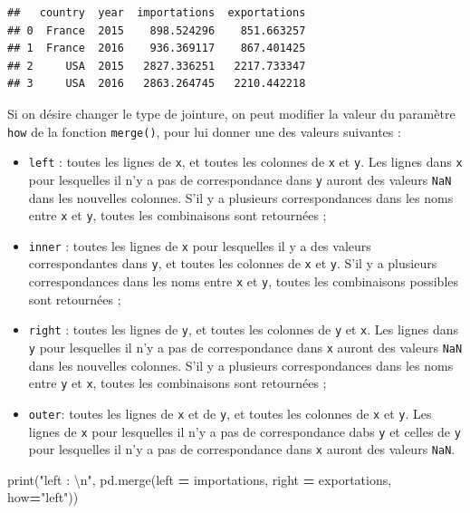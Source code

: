 \documentclass[
  12pt,
]{book}
\newenvironment{Shaded}{\begin{snugshade}}{\end{snugshade}}
\newcommand{\BuiltInTok}[1]{#1}
\newcommand{\CharTok}[1]{\textcolor[rgb]{0.31,0.60,0.02}{#1}}
\newcommand{\NormalTok}[1]{#1}
\newcommand{\OperatorTok}[1]{\textcolor[rgb]{0.81,0.36,0.00}{\textbf{#1}}}
\newcommand{\StringTok}[1]{\textcolor[rgb]{0.31,0.60,0.02}{#1}}
\providecommand{\tightlist}{%
  \setlength{\itemsep}{0pt}\setlength{\parskip}{0pt}}
\numberwithin{equation}{section}
\numberwithin{countremarque}{section}
\begin{document}
\begin{lstlisting}
##   country  year  importations  exportations
## 0  France  2015    898.524296    851.663257
## 1  France  2016    936.369117    867.401425
## 2     USA  2015   2827.336251   2217.733347
## 3     USA  2016   2863.264745   2210.442218
\end{lstlisting}

Si on désire changer le type de jointure, on peut modifier la valeur du paramètre \texttt{how} de la fonction \texttt{merge()}, pour lui donner une des valeurs suivantes :

\begin{itemize}
\tightlist
\item
  \texttt{left} : toutes les lignes de \texttt{x}, et toutes les colonnes de \texttt{x} et \texttt{y}. Les lignes dans \texttt{x} pour lesquelles il n'y a pas de correspondance dans \texttt{y} auront des valeurs \texttt{NaN} dans les
  nouvelles colonnes. S'il y a plusieurs correspondances dans les noms entre \texttt{x} et \texttt{y}, toutes
  les combinaisons sont retournées ;
\item
  \texttt{inner} : toutes les lignes de \texttt{x} pour lesquelles il y a des valeurs correspondantes dans \texttt{y}, et toutes les colonnes de \texttt{x} et \texttt{y}. S'il y a plusieurs correspondances dans les noms
  entre \texttt{x} et \texttt{y}, toutes les combinaisons possibles sont retournées ;
\item
  \texttt{right} : toutes les lignes de \texttt{y}, et toutes les colonnes de \texttt{y} et \texttt{x}. Les lignes dans
  \texttt{y} pour lesquelles il n'y a pas de correspondance dans \texttt{x} auront des valeurs \texttt{NaN} dans les
  nouvelles colonnes. S'il y a plusieurs correspondances dans les noms entre \texttt{y} et \texttt{x}, toutes
  les combinaisons sont retournées ;
\item
  \texttt{outer}: toutes les lignes de \texttt{x} et de \texttt{y}, et toutes les colonnes de \texttt{x} et \texttt{y}. Les lignes de \texttt{x} pour lesquelles il n'y a pas de correspondance dabs \texttt{y} et celles de \texttt{y} pour lesquelles il n'y a pas de correspondance dans \texttt{x} auront des valeurs \texttt{NaN}.
\end{itemize}

\begin{Shaded}
\begin{Highlighting}[]
\BuiltInTok{print}\NormalTok{(}\StringTok{"left : }\CharTok{\textbackslash{}n}\StringTok{"}\NormalTok{, pd.merge(left }\OperatorTok{=}\NormalTok{ importations, right }\OperatorTok{=}\NormalTok{ exportations, how}\OperatorTok{=}\StringTok{"left"}\NormalTok{))}
\end{Highlighting}
\end{Shaded}
\end{document}
